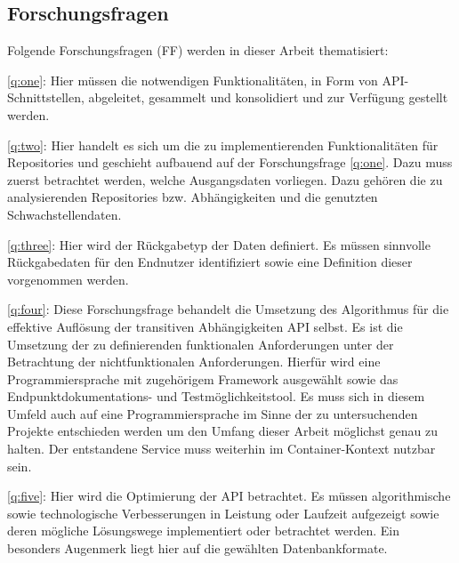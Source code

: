 \subsection{Forschungsfragen} \label{sec:Forschungsfragen}
    Folgende Forschungsfragen (FF) werden in dieser Arbeit thematisiert:

    \ref{q:one}:
    Hier müssen die notwendigen Funktionalitäten, in Form von \ac{API}-Schnittstellen, abgeleitet, gesammelt und konsolidiert und zur Verfügung gestellt werden.

    \ref{q:two}:
    Hier handelt es sich um die zu implementierenden Funktionalitäten für Repositories und geschieht aufbauend auf der Forschungsfrage \ref{q:one}.
    Dazu muss zuerst betrachtet werden, welche Ausgangsdaten vorliegen.
    Dazu gehören die zu analysierenden Repositories bzw. Abhängigkeiten und die genutzten Schwachstellendaten.

    \ref{q:three}:
    Hier wird der Rückgabetyp der Daten definiert.
    Es müssen sinnvolle Rückgabedaten für den Endnutzer identifiziert sowie eine Definition dieser vorgenommen werden.

    \ref{q:four}:
    Diese Forschungsfrage behandelt die Umsetzung des Algorithmus für die effektive Auflösung der transitiven Abhängigkeiten \ac{API} selbst.
    Es ist die Umsetzung der zu definierenden funktionalen Anforderungen unter der Betrachtung der nichtfunktionalen Anforderungen.
    Hierfür wird eine Programmiersprache mit zugehörigem Framework ausgewählt sowie das End\-punkt\-doku\-mentations- und Test\-möglich\-keits\-tool.
    Es muss sich in diesem Umfeld auch auf eine Programmiersprache im Sinne der zu untersuchenden Projekte entschieden werden um den Umfang dieser Arbeit möglichst genau zu halten.
    Der entstandene Service muss weiterhin im Container-Kontext nutzbar sein.

    \ref{q:five}:
    Hier wird die Optimierung der \ac{API} betrachtet.
    Es müssen algorithmische sowie technologische Verbesserungen in Leistung oder Laufzeit aufgezeigt sowie deren mögliche Lösungswege implementiert oder betrachtet werden.
    Ein besonders Augenmerk liegt hier auf die gewählten Datenbankformate.
